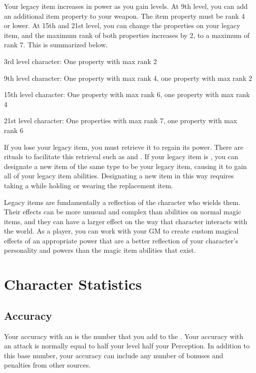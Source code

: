         Your legacy item increases in power as you gain levels.
        At 9th level, you can add an additional item property to your weapon.
        The item property must be rank 4 or lower.
        At 15th and 21st level, you can change the properties on your legacy item, and the maximum rank of both properties increases by 2, to a maximum of rank 7.
        This is summarized below.
        \begin{raggeditemize}
            \item 3rd level character: One property with max rank 2
            \item 9th level character: One property with max rank 4, one property with max rank 2
            \item 15th level character: One property with max rank 6, one property with max rank 4
            \item 21st level character: One properties with max rank 7, one property with max rank 6
        \end{raggeditemize}

        If you lose your legacy item, you must retrieve it to regain its power.
        There are rituals to facilitate this retrieval such as  and .
        If your legacy item is , you can designate a new item of the same type to be your legacy item, causing it to gain all of your legacy item abilities.
        Designating a new item in this way requires taking a  while holding or wearing the replacement item.

            Legacy items are fundamentally a reflection of the character who wields them.
            Their effects can be more unusual and complex than abilities on normal magic items, and they can have a larger effect on the way that character interacts with the world.
            As a player, you can work with your GM to create custom magical effects of an appropriate power that are a better reflection of your character's personality and powers than the magic item abilities that exist.

\section{Character Statistics}\label{Character Statistics}

    \subsection{Accuracy}\label{Accuracy}
        Your accuracy with an  is the number that you add to the .
        Your accuracy with an attack is normally equal to half your level \add half your Perception.
        In addition to this base number, your accuracy can include any number of bonuses and penalties from other sources.

